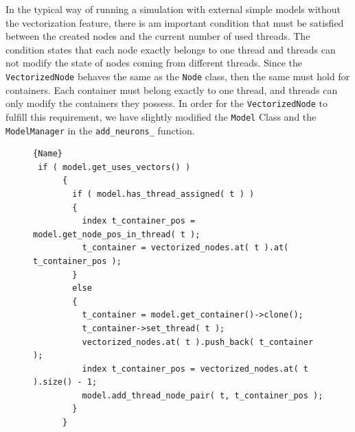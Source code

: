 In the typical way of running a simulation with external simple models without the vectorization feature, there is am important condition that must be satisfied between the created nodes and the current number of used threads. The condition states that each node exactly belongs to one thread and threads can not modify the state of nodes coming from different threads. Since the \texttt{VectorizedNode} behaves the same as the \texttt{Node} class, then the same must hold for containers. Each container must belong exactly to one thread, and threads can only modify the containers they possess. In order for the \texttt{VectorizedNode} to fulfill this requirement, we have slightly modified the \texttt{Model} Class and the \texttt{ModelManager} in the \texttt{add\_neurons\_} function.\\


\begin{figure}[ht!]
    \centering
\begin{lstlisting}[caption=Assigning containers to threads,frame=tlrb, label=lst:thread_container]{Name}
 if ( model.get_uses_vectors() )
      {
        if ( model.has_thread_assigned( t ) )
        {
          index t_container_pos = model.get_node_pos_in_thread( t );
          t_container = vectorized_nodes.at( t ).at( t_container_pos );
        }
        else
        {
          t_container = model.get_container()->clone();
          t_container->set_thread( t );
          vectorized_nodes.at( t ).push_back( t_container );
          index t_container_pos = vectorized_nodes.at( t ).size() - 1;
          model.add_thread_node_pair( t, t_container_pos );
        }
      }
      
\end{lstlisting}
\end{figure}

